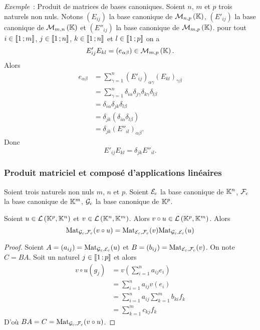 \emph{Exemple}~: Produit de matrices de bases canoniques. Soient \(n\), \(m\) et 
\(p\) trois naturels non nuls. Notons \((E_{ij})\) la base canonique de 
\(\mathcal{M}_{n,p}\left(\mathbb{K}\right)\), \((E'_{ij})\) la base canonique de \(\mathcal{M}_{m,n}\left(\mathbb{K}\right)\) et 
\((E''_{ij})\) la base canonique de \(\mathcal{M}_{m,p}\left(\mathbb{K}\right)\). pour tout \(i \in 
\mathopen{\llbracket}1\mathclose{}\mathpunct{};m\mathclose{\rrbracket}\), \(j \in \mathopen{\llbracket}1\mathclose{}\mathpunct{};n\mathclose{\rrbracket}\), \(k \in 
\mathopen{\llbracket}1\mathclose{}\mathpunct{};n\mathclose{\rrbracket}\) et \(l \in \mathopen{\llbracket}1\mathclose{}\mathpunct{};p\mathclose{\rrbracket}\) on a
\begin{equation}
  E'_{ij} E_{kl} =(e_{\alpha \beta}) \in \mathcal{M}_{m,p}\left(\mathbb{K}\right).
\end{equation}
Alors
\begin{align*}
  e_{\alpha \beta} &=\sum_{\gamma=1}^n (E'_{ij})_{\alpha \gamma} 
  (E_{kl})_{\gamma \beta}\\
  &=\sum_{\gamma=1}^n \delta_{i\alpha} \delta_{j\gamma} \delta_{k\gamma} 
  \delta_{l\beta} \\
  &= \delta_{i\alpha} \delta_{jk} \delta_{l\beta}\\
  &= \delta_{jk} (\delta_{i\alpha} \delta_{l\beta})\\
  &= \delta_{jk} (E''_{il})_{\alpha\beta}.
\end{align*}
Donc
\begin{equation}
  E'_{ij} E_{kl} = \delta_{jk} E''_{il}.
\end{equation}

\subsubsection{Produit matriciel et composé d'applications linéaires}

Soient trois naturels non nuls \(m\), \(n\) et \(p\). Soient \(\mathcal{E}_c\) la base 
canonique de \(\mathbb{K}^n\), \(\mathcal{F}_c\) la base canonique de \(\mathbb{K}^m\),  \(\mathcal{G}_c\) la 
base canonique de \(\mathbb{K}^p\).

\begin{prop}
  Soient \(u \in \mathcal{L}\left(\mathbb{K}^p,\mathbb{K}^n\right)\) et \(v \in \mathcal{L}\left(\mathbb{K}^n,\mathbb{K}^m\right)\). Alors \(v 
  \circ u \in \mathcal{L}\left(\mathbb{K}^p,\mathbb{K}^m\right)\). Alors
  \begin{equation}
    \mathrm{Mat}_{\mathcal{G}_c,\mathcal{F}_c}(v \circ u) = \mathrm{Mat}_{\mathcal{E}_c,\mathcal{F}_c}(v) \mathrm{Mat}_{\mathcal{G}_c,\mathcal{E}_c}(u)
  \end{equation}
\end{prop}
\begin{proof}
  Soient \(A= (a_{ij})=\mathrm{Mat}_{\mathcal{G}_c,\mathcal{E}_c}(u)\) et \(B=(b_{ij})= 
  \mathrm{Mat}_{\mathcal{E}_c,\mathcal{F}_c}(v)\). On note \(C=BA\). Soit un naturel \(j \in 
  \mathopen{\llbracket}1\mathclose{}\mathpunct{};p\mathclose{\rrbracket}\) et alors
  \begin{align*}
    v \circ u (g_j) &= v\left( \sum_{i=1}^n a_{ij} e_i\right) \\
    &=\sum_{i=1}^n a_{ij} v(e_i) \\
    &=\sum_{i=1}^n a_{ij} \sum_{k=1}^m b_{ki} f_k \\
    &=\sum_{k=1}^m c_{kj} f_k
  \end{align*}
  D'où \(BA=C=\mathrm{Mat}_{\mathcal{G}_c,\mathcal{F}_c}(v \circ u)\).
\end{proof}

